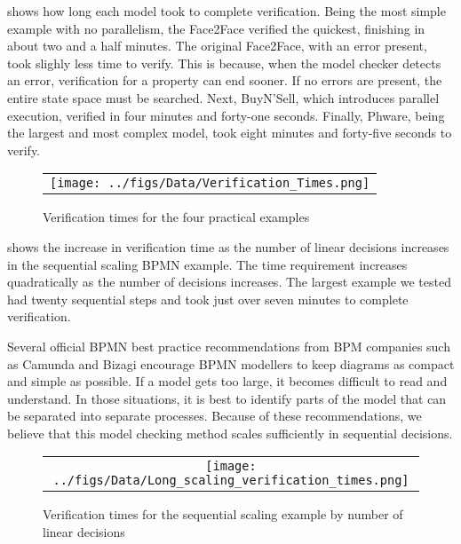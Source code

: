  shows how long each model took to complete verification. Being the most simple example with no parallelism, the Face2Face verified the quickest, finishing in about two and a half minutes. The original Face2Face, with an error present, took slighly less time to verify. This is because, when the model checker detects an error, verification for a property can end sooner. If no errors are present, the entire state space must be searched. Next, BuyN'Sell, which introduces parallel execution, verified in four minutes and forty-one seconds. Finally, Phware, being the largest and most complex model, took eight minutes and forty-five seconds to verify.

\begin{figure*}[t]
  \begin{center}
    \begin{tabular}{c}
        \texttt{[image: ../figs/Data/Verification\_Times.png]}
    \end{tabular}
  \end{center}
\caption{Verification times for the four practical examples}
\label{fig:verificationTimes}
\end{figure*}

 shows the increase in verification time as the number of linear decisions increases in the sequential scaling BPMN example. The time requirement increases quadratically as the number of decisions increases. The largest example we tested had twenty sequential steps and took just over seven minutes to complete verification.

Several official BPMN best practice recommendations from BPM companies such as Camunda and Bizagi encourage BPMN modellers to keep diagrams as compact and simple as possible. If a model gets too large, it becomes difficult to read and understand. In those situations, it is best to identify parts of the model that can be separated into separate processes. Because of these recommendations, we believe that this model checking method scales sufficiently in sequential decisions.

\begin{figure*}[t]
  \begin{center}
    \begin{tabular}{c}
        \texttt{[image: ../figs/Data/Long\_scaling\_verification\_times.png]}
    \end{tabular}
  \end{center}
\caption{Verification times for the sequential scaling example by number of linear decisions}
\label{fig:longScalingVerificationTimes}
\end{figure*}

